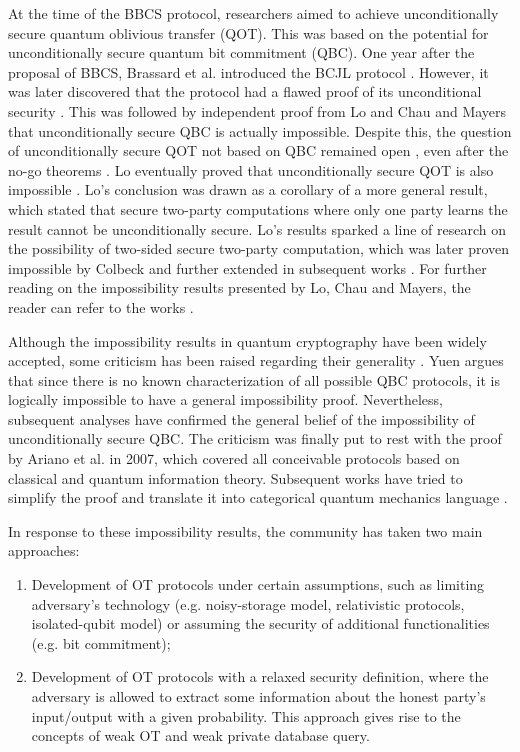 At the time of the BBCS protocol, researchers aimed to achieve unconditionally secure quantum oblivious transfer (QOT). This was based on the potential for unconditionally secure quantum bit commitment (QBC). One year after the proposal of BBCS, Brassard et al. introduced the BCJL protocol \cite{BCJL93}. However, it was later discovered that the protocol had a flawed proof of its unconditional security \cite{M96}. This was followed by independent proof from Lo and Chau \cite{LC97} and Mayers \cite{M97} that unconditionally secure QBC is actually impossible. Despite this, the question of unconditionally secure QOT not based on QBC remained open \cite{BC96}, even after the no-go theorems \cite{LC97, M97}. Lo eventually proved that unconditionally secure QOT is also impossible \cite{L97}. Lo's conclusion was drawn as a corollary of a more general result, which stated that secure two-party computations where only one party learns the result cannot be unconditionally secure. Lo's results sparked a line of research on the possibility of two-sided secure two-party computation, which was later proven impossible by Colbeck \cite{C07} and further extended in subsequent works \cite{BCS12, SSS14, SJFHV13}. For further reading on the impossibility results presented by Lo, Chau and Mayers, the reader can refer to the works \cite{BCMS97, S99}.

Although the impossibility results in quantum cryptography have been widely accepted, some criticism has been raised regarding their generality \cite{Y00, Y02, Y04, C03}. Yuen \cite{Y00} argues that since there is no known characterization of all possible QBC protocols, it is logically impossible to have a general impossibility proof. Nevertheless, subsequent analyses \cite{B01, C05, Che07} have confirmed the general belief of the impossibility of unconditionally secure QBC. The criticism was finally put to rest with the proof by Ariano et al. \cite{A07} in 2007, which covered all conceivable protocols based on classical and quantum information theory. Subsequent works have tried to simplify the proof \cite{CAP10, CAPSW13, H13} and translate it into categorical quantum mechanics language \cite{K12, SHW20, BK22}.

In response to these impossibility results, the community has taken two main approaches:

\begin{enumerate}
    \item Development of OT protocols under certain assumptions, such as limiting adversary's technology (e.g. noisy-storage model, relativistic protocols, isolated-qubit model) or assuming the security of additional functionalities (e.g. bit commitment);
    \item Development of OT protocols with a relaxed security definition, where the adversary is allowed to extract some information about the honest party's input/output with a given probability. This approach gives rise to the concepts of weak OT and weak private database query.
\end{enumerate}

